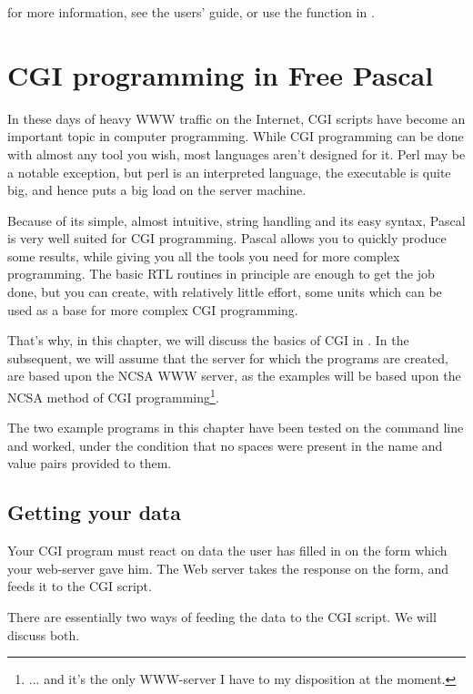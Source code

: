 \documentclass{report}
\begin{document}
for more information, see the  users' guide, or use the 
function in .

\chapter{CGI programming in Free Pascal}
In these days of heavy WWW traffic on the Internet, CGI scripts have become
an important topic in computer programming. While CGI programming can be
done with almost any tool you wish, most languages aren't designed for it.
Perl may be a notable exception, but perl is an interpreted language, the
executable is quite big, and hence puts a big load on the server machine.

Because of its simple, almost intuitive, string handling and its easy syntax, 
Pascal is very well suited for CGI programming. Pascal allows you to quickly
produce some results, while giving you all the tools you need for more
complex programming. The basic RTL routines in principle are enough to get
the job done, but you can create, with relatively little effort, some units
which can be used as a base for more complex CGI programming.

That's why, in this chapter, we will discuss the basics of CGI in \fpk.
In the subsequent, we will assume that the server for which the programs are 
created, are based upon the NCSA  WWW server, as the examples
will be based upon the NCSA method of CGI programming\footnote{... and it's 
the only WWW-server I have to my disposition at the moment.}.

The two example programs in this chapter have been tested on the command line 
and worked, under the condition that no spaces were present in the name and 
value pairs provided to them.

\section{Getting your data}
Your CGI program must react on data the user has filled in on the form which
your web-server gave him. The Web server takes the response on the form, and
feeds it to the CGI script.

There are essentially two ways of feeding the data to the CGI script. We will
discuss both.
\end{document}
